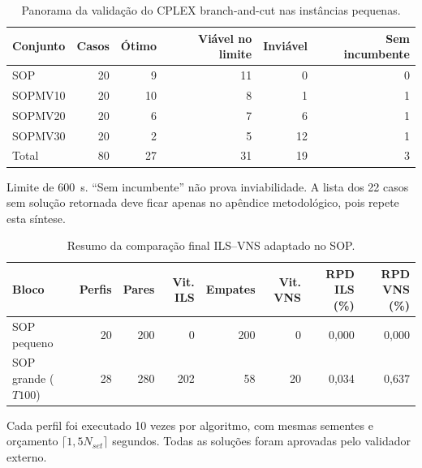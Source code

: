 
\begin{table}[htbp]
\centering
\caption{Panorama da valida\c{c}\~ao do CPLEX branch-and-cut nas inst\^ancias pequenas.}
\label{tab:cplex-branch-cut-overview}
\begin{threeparttable}
\begin{tabular}{lrrrrr}
\toprule
Conjunto & Casos & \'Otimo & Vi\'avel no limite & Invi\'avel & Sem incumbente \\
\midrule
SOP & 20 & 9 & 11 & 0 & 0 \\
SOPMV10 & 20 & 10 & 8 & 1 & 1 \\
SOPMV20 & 20 & 6 & 7 & 6 & 1 \\
SOPMV30 & 20 & 2 & 5 & 12 & 1 \\
\midrule
Total & 80 & 27 & 31 & 19 & 3 \\
\bottomrule
\end{tabular}
\begin{tablenotes}[flushleft]\footnotesize
\item Limite de \SI{600}{\second}. ``Sem incumbente'' n\~ao prova inviabilidade. A lista dos 22 casos sem solu\c{c}\~ao retornada deve ficar apenas no ap\^endice metodol\'ogico, pois repete esta s\'intese.
\end{tablenotes}
\end{threeparttable}
\end{table}

\begin{table}[htbp]
\centering
\caption{Resumo da compara\c{c}\~ao final ILS--VNS adaptado no SOP.}
\label{tab:ils-vns-sop-summary}
\begin{tabular}{lrrrrrrr}
\toprule
Bloco & Perfis & Pares & Vit. ILS & Empates & Vit. VNS & RPD ILS (\%) & RPD VNS (\%) \\
\midrule
SOP pequeno & 20 & 200 & 0 & 200 & 0 & 0{,}000 & 0{,}000 \\
SOP grande ($T100$) & 28 & 280 & 202 & 58 & 20 & 0{,}034 & 0{,}637 \\
\bottomrule
\end{tabular}
\begin{minipage}{0.94\linewidth}\footnotesize Cada perfil foi executado 10 vezes por algoritmo, com mesmas sementes e or\c{c}amento $\lceil1{,}5N_{set}\rceil$ segundos. Todas as solu\c{c}\~oes foram aprovadas pelo validador externo.\end{minipage}
\end{table}

